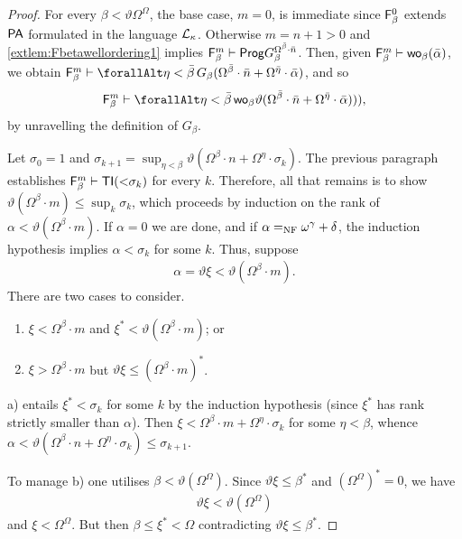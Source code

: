 \documentclass[UKenglish,cleveref,DIV=12]{scrartcl}
\let\forall\forallAlt
\theoremstyle{definition}
\theoremstyle{definition}
\begin{document}
\begin{proof}
For every $\beta<\vartheta\Omega^\Omega$, the base case, $m=0$, is immediate
since $\mathsf{F}_\beta^0$ extends $\mathsf{PA}$ formulated in the language $\mathcal{L}_\kappa$.
Otherwise $m=n+1>0$ and \cref{extlem:Fbetawellordering1} implies $\mathsf{F}_\beta^m\vdash\mathsf{Prog}
G_\beta^{\Omega^{\bar\beta}\cdot\bar n}$. Then, given $\mathsf{F}_\beta^m\vdash
\mathsf{wo}_\beta(\bar \alpha)$, we obtain $\F_\beta^m\proves
\forall\eta<\bar\beta\,G_\beta(\Omega^{\bar\beta}\cdot\bar
n+\Omega^{\bar\eta}\cdot\bar\alpha)$, and so
\begin{align*}
  \F_\beta^m\proves\forall\eta<\bar\beta\,\wo_\beta\vartheta(\Omega^{\bar \beta}\cdot\bar
  n+\Omega^{\bar \eta}\cdot\bar\alpha))),
\end{align*}
by unravelling the definition of $G_\beta$.

Let $\sigma_0=1$ and $\sigma_{k+1}=\sup_{\eta<\beta}\vartheta(\Omega^{\beta}\cdot
n+\Omega^\eta\cdot\sigma_k)$. The previous paragraph establishes $\mathsf{F}_\beta^m\vdash
\mathsf{TI}(\mathord<\sigma_k)$ for every $k$. Therefore, all that remains is to show
$\vartheta(\Omega^{\beta}\cdot m)\le\sup_k\sigma_k$, which proceeds by induction
on the rank of $\alpha<\vartheta(\Omega^{\beta}\cdot m)$. If $\alpha=0$ we are
done, and if $\alpha=_{\mathrm{NF}}\omega^\gamma+\delta$, the induction hypothesis implies
$\alpha<\sigma_k$ for some $k$. Thus, suppose
\begin{gather*}
  \alpha=\vartheta\xi<\vartheta(\Omega^{\beta}\cdot m).
\end{gather*}
There are two cases to consider.
\begin{enumerate}
 \item $\xi<\Omega^{\beta}\cdot m$ and $\xi^*<\vartheta(\Omega^{\beta}\cdot m)$; or
 \item $\xi>\Omega^{\beta}\cdot m$ but $\vartheta\xi\le(\Omega^{\beta}\cdot m)^*$.
\end{enumerate}
a) entails $\xi^*<\sigma_k$ for some $k$ by the induction hypothesis
(since $\xi^*$ has rank strictly smaller than $\alpha$). Then
$\xi<\Omega^{\beta}\cdot m+\Omega^\eta\cdot\sigma_k$ for some $\eta<\beta$, whence
$\alpha<\vartheta(\Omega^{\beta}\cdot n+\Omega^\eta\cdot\sigma_k)\le\sigma_{k+1}$.

To manage b) one utilises $\beta<\vartheta(\Omega^\Omega)$. Since
$\vartheta\xi\le\beta^*$ and $(\Omega^\Omega)^*=0$, we have
\begin{align*}
  \vartheta\xi<\vartheta(\Omega^\Omega)
\end{align*}
and $\xi<\Omega^\Omega$. %
But then $\beta\le\xi^*<\Omega$
contradicting $\vartheta\xi\le\beta^*$.


\end{proof}
\end{document}
